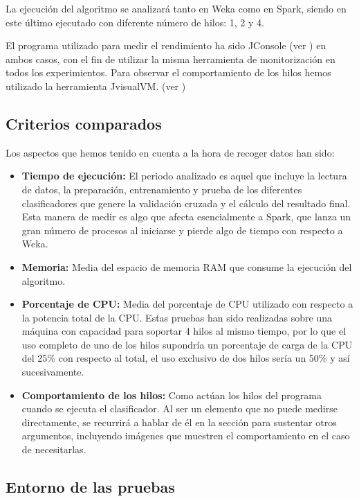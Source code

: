 La ejecución del algoritmo se analizará tanto en Weka como en Spark, siendo en este último ejecutado con diferente número de hilos: 1, 2 y 4.

El programa utilizado para medir el rendimiento ha sido JConsole (ver ) en ambos casos, con el fin de utilizar la misma herramienta de monitorización en todos los experimientos.
Para observar el comportamiento de los hilos hemos utilizado la herramienta JvisualVM. (ver )

\subsection{Criterios comparados}

Los aspectos que hemos tenido en cuenta a la hora de recoger datos han sido:

\begin{itemize}
	\item \textbf{Tiempo de ejecución:} El periodo analizado es aquel que incluye la lectura de datos, la preparación, entrenamiento y prueba de los diferentes clasificadores que genere la validación cruzada y el cálculo del resultado final. Esta manera de medir es algo que afecta esencialmente a Spark, que lanza un gran número de procesos al iniciarse y pierde algo de tiempo con respecto a Weka.
	\item \textbf{Memoria:} Media del espacio de memoria RAM que consume la ejecución del algoritmo.
	\item \textbf{Porcentaje de CPU:} Media del porcentaje de CPU utilizado con respecto a la potencia total de la CPU. Estas pruebas han sido realizadas sobre una máquina con capacidad para soportar 4 hilos al mismo tiempo, por lo que el uso completo de uno de los hilos supondría un porcentaje de carga de la CPU del 25\% con respecto al total, el uso exclusivo de dos hilos sería un 50\% y así sucesivamente.
	\item \textbf{Comportamiento de los hilos:} Como actúan los hilos del programa cuando se ejecuta el clasificador. Al ser un elemento que no puede medirse directamente, se recurrirá a hablar de él en la sección  para sustentar otros argumentos, incluyendo imágenes que muestren el comportamiento en el caso de necesitarlas.
\end{itemize}


\subsection{Entorno de las pruebas}

